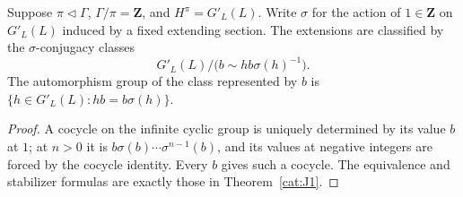 \begin{corollary}\label{cat:J2}
Suppose $\pi\triangleleft\Gamma$, $\Gamma/\pi=\mathbf Z$, and
$H^\pi=G'_L(L)$.  Write $\sigma$ for the action of $1\in\mathbf Z$ on
$G'_L(L)$ induced by a fixed extending section.  The extensions are
classified by the $\sigma$-conjugacy classes
\[
 G'_L(L)/\bigl(b\sim h b\sigma(h)^{-1}\bigr).
\]
The automorphism group of the class represented by $b$ is
$\{h\in G'_L(L):h b=b\sigma(h)\}$.
\end{corollary}
\begin{proof}
A cocycle on the infinite cyclic group is uniquely determined by its
value $b$ at $1$; at $n>0$ it is
$b\sigma(b)\cdots\sigma^{n-1}(b)$, and its values at negative integers
are forced by the cocycle identity.  Every $b$ gives such a cocycle.
The equivalence and stabilizer formulas are exactly those in
Theorem~\ref{cat:J1}.
\end{proof}

